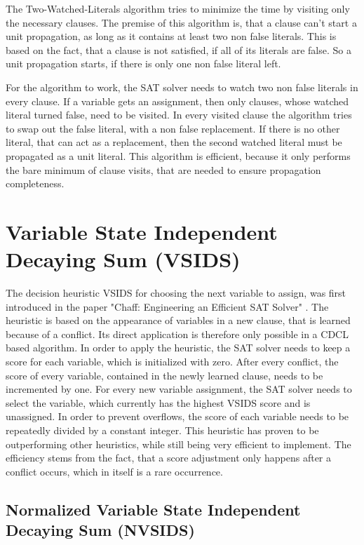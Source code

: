 The Two-Watched-Literals algorithm tries to minimize the time by visiting only the necessary clauses. The premise of this algorithm is, that a clause can't start a unit propagation, as long as it contains at least two non false literals. This is based on the fact, that a clause is not satisfied, if all of its literals are false. So a unit propagation starts, if there is only one non false literal left. \cite{moskewicz2001chaff}

For the algorithm to work, the SAT solver needs to watch two non false literals in every clause. If a variable gets an assignment, then only clauses, whose watched literal turned false, need to be visited. In every visited clause the algorithm tries to swap out the false literal, with a non false replacement. If there is no other literal, that can act as a replacement, then the second watched literal must be propagated as a unit literal. This algorithm is efficient, because it only performs the bare minimum of clause visits, that are needed to ensure propagation completeness. \cite{moskewicz2001chaff}

\section{Variable State Independent Decaying Sum (VSIDS)}
\label{sec:VSIDS}

The decision heuristic VSIDS for choosing the next variable to assign, was first introduced in the paper "Chaff: Engineering an Efficient SAT Solver" \cite{moskewicz2001chaff}. The heuristic is based on the appearance of variables in a new clause, that is learned because of a conflict. Its direct application is therefore only possible in a CDCL based algorithm. In order to apply the heuristic, the SAT solver needs to keep a score for each variable, which is initialized with zero. After every conflict, the score of every variable, contained in the newly learned clause, needs to be incremented by one. For every new variable assignment, the SAT solver needs to select the variable, which currently has the highest VSIDS score and is unassigned. In order to prevent overflows, the score of each variable needs to be repeatedly divided by a constant integer. This heuristic has proven to be outperforming other heuristics, while still being very efficient to implement. The efficiency stems from the fact, that a score adjustment only happens after a conflict occurs, which in itself is a rare occurrence.

\subsection{Normalized Variable State Independent Decaying Sum (NVSIDS)}
\label{sec:NVSIDS}

